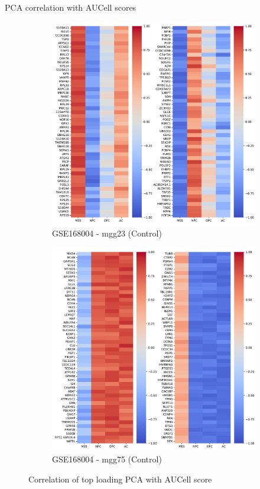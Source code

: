 \documentclass[aspectratio=169,9pt]{beamer}
\begin{document}
\begin{frame}{PCA correlation with AUCell scores}
\begin{adjustwidth}{-5cm}{-5cm}
\begin{figure}
\begin{subfigure}[b]{0.38\textwidth}
                    \includegraphics[width=\textwidth]{mgg23_load-corr}
                    \caption{GSE168004 - mgg23 (Control)}
                \end{subfigure}
                \begin{subfigure}[b]{0.38\textwidth}
                    \centering
                    \includegraphics[width=\textwidth]{mgg75_load-corr}
                    \caption{GSE168004 - mgg75 (Control)}
                \end{subfigure}
                \caption{Correlation of top loading PCA with AUCell score}
            \end{figure}
        \end{adjustwidth}
    \end{frame}
\end{document}
